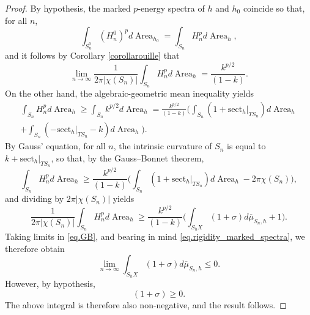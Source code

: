 \documentclass[10pt]{amsart}
\theoremstyle{plain}
\theoremstyle{definition}
\newcommand{\sect}{\mathrm{sect}}
\DeclareMathOperator{\Area}{Area}
\begin{document}
\begin{proof}
By hypothesis, the marked $p$-energy spectra of $h$ and $h_0$ coincide so that, for all $n$,\vspace*{-3pt}
\begin{equation*}
\int_{S^0_n}(H_n^0)^p d\Area_{h_0}=\int_{S_n} H_n^p d\Area_{h},
\end{equation*}
and it follows by Corollary \ref{corollarouille} that\vspace*{-3pt}
\begin{equation}\label{eq.rigidity_marked_spectra}
\lim_{n\to\infty}\frac{1}{2\pi|\chi(S_n)|}\int_{S_n} H_n^p d\Area_{h}=\frac{k^{p/2}}{(1-k)}.
\end{equation}
On the other hand, the algebraic-geometric mean inequality yields\vspace*{-3pt}
\begin{multline*}
\int_{S_n} H_n^p d\Area_{h}\geq\int_{S_n} k^{p/2}d\Area_{h}=\frac{k^{p/2}}{(1-k)}\biggl(\int_{S_n}(1+\sect_h|_{TS_n})d\Area_{h}\\[-3pt]
+ \int_{S_n} (-\sect_h|_{TS_n} - k)d\Area_{h}\biggr).
\end{multline*}
By Gauss' equation, for all $n$, the intrinsic curvature of $S_n$ is equal to $k+\sect_h|_{TS_n}$, so that, by the Gauss--Bonnet theorem,\vspace*{-3pt}
\begin{equation*}
\int_{S_n} H_n^p d\Area_{h} \geq \frac{k^{p/2}}{(1-k)}\biggl(\int_{S_n}(1+\sect_h|_{TS_n})d\Area_{h} - 2\pi\chi(S_n)\biggr),
\end{equation*}
and dividing by $2\pi\left|\chi(S_n)\right|$ yields\vspace*{-3pt}
\begin{equation}\label{eq.GB}
\frac{1}{2\pi|\chi(S_n)|}\int_{S_n} H_n^p d\Area_{h}\geq \frac{k^{p/2}}{(1-k)}\biggl(\int_{S_hX}(1+\sigma)d\overline\mu_{S_n,h}+1\biggr).
\end{equation}
Taking limits in \eqref{eq.GB}, and bearing in mind \eqref{eq.rigidity_marked_spectra}, we therefore obtain\vspace*{-3pt}
\begin{equation*}
\lim_{n\to\infty}\int_{S_hX}(1+\sigma)d\overline\mu_{S_n,h}\leq 0.
\end{equation*}
However, by hypothesis,
\begin{equation*}
(1+\sigma)\geq 0.
\end{equation*}
The above integral is therefore also non-negative, and the result follows.
\end{proof}
\end{document}
